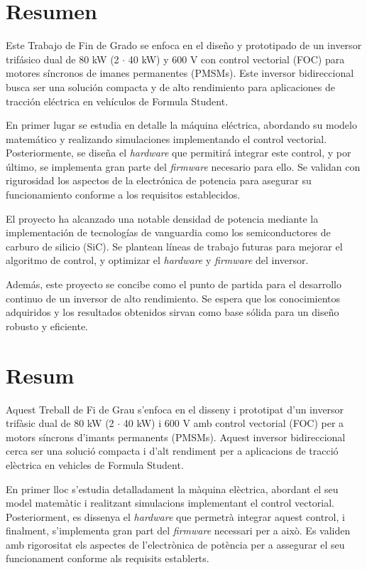 \chapter*{Resumen}
Este Trabajo de Fin de Grado se enfoca en el diseño y prototipado de un inversor trifásico dual de 80 kW (2 $\cdot$ 40 kW) y 600 V con control vectorial (FOC) para motores síncronos de imanes permanentes (PMSMs). Este inversor bidireccional busca ser una solución compacta y de alto rendimiento para aplicaciones de tracción eléctrica en vehículos de Formula Student.

En primer lugar se estudia en detalle la máquina eléctrica, abordando su modelo matemático y realizando simulaciones implementando el control vectorial. Posteriormente, se diseña el \textit{hardware} que permitirá integrar este control, y por último, se implementa gran parte del \textit{firmware} necesario para ello. Se validan con rigurosidad los aspectos de la electrónica de potencia para asegurar su funcionamiento conforme a los requisitos establecidos.

El proyecto ha alcanzado una notable densidad de potencia mediante la implementación de tecnologías de vanguardia como los semiconductores de carburo de silicio (SiC). Se plantean líneas de trabajo futuras para mejorar el algoritmo de control, y optimizar el \textit{hardware} y \textit{firmware} del inversor.

Además, este proyecto se concibe como el punto de partida para el desarrollo continuo de un inversor de alto rendimiento. Se espera que los conocimientos adquiridos y los resultados obtenidos sirvan como base sólida para un diseño robusto y eficiente.

\chapter*{Resum}
Aquest Treball de Fi de Grau s'enfoca en el disseny i prototipat d'un inversor trifàsic dual de 80 kW (2 $\cdot$ 40 kW) i 600 V amb control vectorial (FOC) per a motors síncrons d'imants permanents (PMSMs). Aquest inversor bidireccional cerca ser una solució compacta i d'alt rendiment per a aplicacions de tracció elèctrica en vehicles de Formula Student.

En primer lloc s'estudia detalladament la màquina elèctrica, abordant el seu model matemàtic i realitzant simulacions implementant el control vectorial. Posteriorment, es dissenya el \textit{hardware} que permetrà integrar aquest control, i finalment, s'implementa gran part del \textit{firmware} necessari per a això. Es validen amb rigorositat els aspectes de l'electrònica de potència per a assegurar el seu funcionament conforme als requisits establerts.

